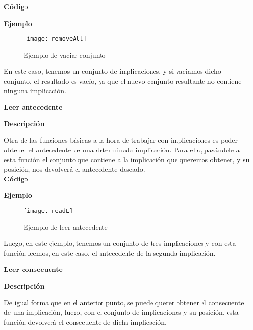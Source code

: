    \textbf{C\'odigo}

    
    \bigskip

    \textbf{Ejemplo}

    \begin{figure}[H]
        \centering
        \texttt{[image: removeAll]}
        \caption{Ejemplo de vaciar conjunto}
        \label{fig:removeAll}
    \end{figure}

    En este caso, tenemos un conjunto de implicaciones, y si vaciamos dicho conjunto, el resultado es vac\'io, ya que el nuevo 
    conjunto resultante no contiene ninguna implicaci\'on.

    \clearpage

\textbf{ \large Leer antecedente}

\smallskip

    \textbf{Descripci\'on}

    Otra de las funciones b\'asicas a la hora de trabajar con implicaciones es poder obtener el antecedente de una determinada 
    implicaci\'on. Para ello, pas\'andole a esta funci\'on el conjunto que contiene a la implicaci\'on que queremos obtener, y su 
    posici\'on, nos devolver\'a el antecedente deseado.
    \\


    \textbf{C\'odigo}

    
    \bigskip

    \textbf{Ejemplo}

    \begin{figure}[H]
        \centering
        \texttt{[image: readL]}
        \caption{Ejemplo de leer antecedente}
        \label{fig:readL}
    \end{figure}

    Luego, en este ejemplo, tenemos un conjunto de tres implicaciones y con esta funci\'on leemos, en este caso, el antecedente de 
    la segunda implicaci\'on. 
    \\

    \bigskip

\textbf{ \large Leer consecuente}

\smallskip

    \textbf{Descripci\'on}

    De igual forma que en el anterior punto, se puede querer obtener el consecuente de una implicaci\'on, luego, con el conjunto de 
    implicaciones y su posici\'on, esta funci\'on devolver\'a el consecuente de dicha implicaci\'on.
    \\


